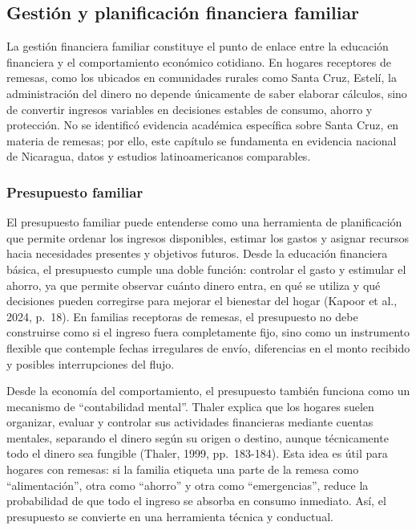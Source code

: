 \documentclass[12pt,letterpaper]{article}
\begin{document}
\subsection{\texorpdfstring{\textbf{Gestión y planificación financiera familiar}}{Gestión y planificación financiera familiar}}\label{gestiuxf3n-y-planificaciuxf3n-financiera-familiar}

La gestión financiera familiar constituye el punto de enlace entre la educación financiera y el comportamiento económico cotidiano. En hogares receptores de remesas, como los ubicados en comunidades rurales como Santa Cruz, Estelí, la administración del dinero no depende únicamente de saber elaborar cálculos, sino de convertir ingresos variables en decisiones estables de consumo, ahorro y protección. No se identificó evidencia académica específica sobre Santa Cruz, en materia de remesas; por ello, este capítulo se fundamenta en evidencia nacional de Nicaragua, datos y estudios latinoamericanos comparables.

\subsubsection{\texorpdfstring{\textbf{Presupuesto familiar}}{Presupuesto familiar}}\label{presupuesto-familiar}

El presupuesto familiar puede entenderse como una herramienta de planificación que permite ordenar los ingresos disponibles, estimar los gastos y asignar recursos hacia necesidades presentes y objetivos futuros. Desde la educación financiera básica, el presupuesto cumple una doble función: controlar el gasto y estimular el ahorro, ya que permite observar cuánto dinero entra, en qué se utiliza y qué decisiones pueden corregirse para mejorar el bienestar del hogar (Kapoor et al., 2024, p.~18). En familias receptoras de remesas, el presupuesto no debe construirse como si el ingreso fuera completamente fijo, sino como un instrumento flexible que contemple fechas irregulares de envío, diferencias en el monto recibido y posibles interrupciones del flujo.

Desde la economía del comportamiento, el presupuesto también funciona como un mecanismo de ``contabilidad mental''. Thaler explica que los hogares suelen organizar, evaluar y controlar sus actividades financieras mediante cuentas mentales, separando el dinero según su origen o destino, aunque técnicamente todo el dinero sea fungible (Thaler, 1999, pp.~183-184). Esta idea es útil para hogares con remesas: si la familia etiqueta una parte de la remesa como ``alimentación'', otra como ``ahorro'' y otra como ``emergencias'', reduce la probabilidad de que todo el ingreso se absorba en consumo inmediato. Así, el presupuesto se convierte en una herramienta técnica y conductual.
\end{document}
